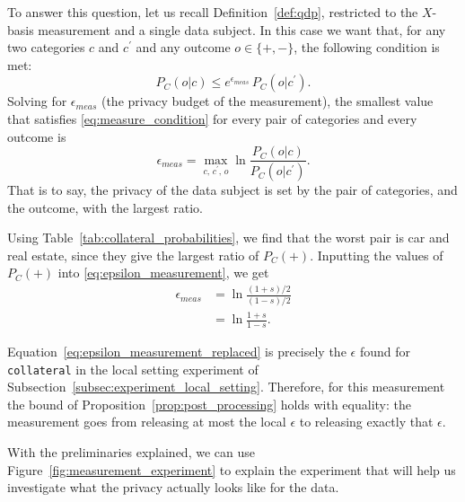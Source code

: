 \documentclass{ieeeaccess}
\begin{document}
To answer this question, let us recall Definition~\ref{def:qdp}, restricted to the $X$-basis measurement and a single data subject. In this case we want that, for any two categories $c$ and $c^{\prime}$ and any outcome $o \in \{+, -\}$, the following condition is met:
\begin{equation}
  P_C(o|c) \leq e^{\epsilon_{meas}}\, P_C(o|c^{\prime}).
  \label{eq:measure_condition}
\end{equation}
Solving for $\epsilon_{meas}$ (the privacy budget of the measurement), the smallest value that satisfies \eqref{eq:measure_condition} for every pair of categories and every outcome is
\begin{equation}
  \epsilon_{meas} = \max_{c,\, c^{\prime},\, o} \ln\frac{P_C(o|c)}{P_C(o|c^{\prime})}.
  \label{eq:epsilon_measurement}
\end{equation}
That is to say, the privacy of the data subject is set by the pair of categories, and the outcome, with the largest ratio.

Using Table~\ref{tab:collateral_probabilities}, we find that the worst pair is car and real estate, since they give the largest ratio of $P_C(+)$. Inputting the values of $P_C(+)$ into \eqref{eq:epsilon_measurement}, we get
\begin{align}
  \epsilon_{meas} &= \ln\frac{(1+s)/2}{(1-s)/2} \nonumber \\
  &= \ln\frac{1+s}{1-s}.
  \label{eq:epsilon_measurement_replaced}
\end{align}

Equation~\eqref{eq:epsilon_measurement_replaced} is precisely the $\epsilon$ found for \texttt{collateral} in the local setting experiment of Subsection~\ref{subsec:experiment_local_setting}. Therefore, for this measurement the bound of Proposition~\ref{prop:post_processing} holds with equality: the measurement goes from releasing at most the local $\epsilon$ to releasing exactly that $\epsilon$.

With the preliminaries explained, we can use Figure~\ref{fig:measurement_experiment} to explain the experiment that will help us investigate what the privacy actually looks like for the data.
\end{document}
